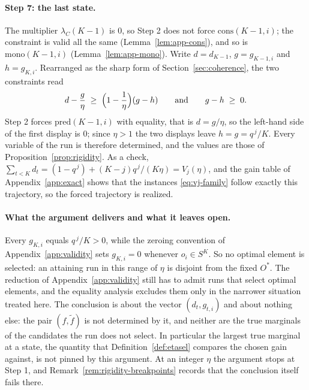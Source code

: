 \paragraph{Step 7: the last state.}
The multiplier $\lambda_C(K-1)$ is $0$, so Step 2 does not force
$\mathrm{cons}(K-1,i)$; the constraint is valid all the same
(Lemma~\ref{lem:app-cons}), and so is $\mathrm{mono}(K-1,i)$
(Lemma~\ref{lem:app-mono}).  Write $d=d_{K-1}$, $g=g_{K-1,i}$ and
$h=g_{K,i}$.  Rearranged as the sharp form of Section~\ref{sec:coherence},
the two constraints read
\[
  d-\frac g\eta\;\ge\;\Bigl(1-\frac1\eta\Bigr)(g-h)
  \qquad\text{and}\qquad
  g-h\;\ge\;0 .
\]
Step 2 forces $\mathrm{pred}(K-1,i)$ with equality, that is $d=g/\eta$, so the
left-hand side of the first display is $0$; since $\eta>1$ the two displays
leave $h=g=q^{\,j}/K$.  Every variable of the run is therefore determined, and
the values are those of Proposition~\ref{prop:rigidity}.  As a check,
$\sum_{t<K}d_t=(1-q^{\,j})+(K-j)q^{\,j}/(K\eta)=V_j(\eta)$, and the gain table
of Appendix~\ref{app:exact} shows that the instances \eqref{eq:vj-family}
follow exactly this trajectory, so the forced trajectory is realized.

\paragraph{What the argument delivers and what it leaves open.}
Every $g_{K,i}$ equals $q^{\,j}/K>0$, while the zeroing convention of
Appendix~\ref{app:validity} sets $g_{K,i}=0$ whenever $o_i\in S^{K}$.  So no
optimal element is selected: an attaining run in this range of $\eta$ is
disjoint from the fixed $O^{\ast}$.  The reduction of
Appendix~\ref{app:validity} still has to admit runs that select optimal
elements, and the equality analysis excludes them only in the narrower
situation treated here.  The conclusion is about the vector $(d_t,g_{t,i})$
and about nothing else: the pair $(f,\tilde f)$ is not determined by it, and
neither are the true marginals of the candidates the run does not select.  In
particular the largest true marginal at a state, the quantity that
Definition~\ref{def:etasel} compares the chosen gain against, is not pinned by
this argument.  At an integer $\eta$ the argument stops at Step 1, and
Remark~\ref{rem:rigidity-breakpoints} records that the conclusion itself
fails there.

